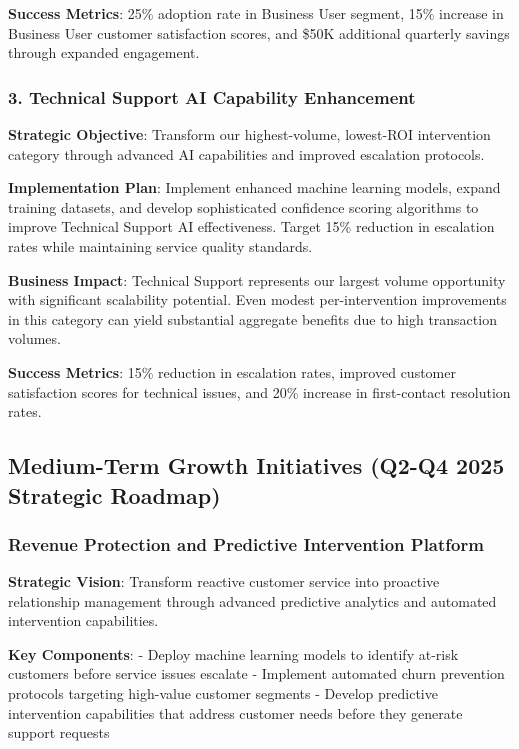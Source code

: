 \documentclass[
  letterpaper,
  DIV=11,
  numbers=noendperiod]{scrartcl}
\begin{document}
\textbf{Success Metrics}: 25\% adoption rate in Business User segment,
15\% increase in Business User customer satisfaction scores, and \$50K
additional quarterly savings through expanded engagement.

\subsubsection{3. Technical Support AI Capability
Enhancement}\label{technical-support-ai-capability-enhancement}

\textbf{Strategic Objective}: Transform our highest-volume, lowest-ROI
intervention category through advanced AI capabilities and improved
escalation protocols.

\textbf{Implementation Plan}: Implement enhanced machine learning
models, expand training datasets, and develop sophisticated confidence
scoring algorithms to improve Technical Support AI effectiveness. Target
15\% reduction in escalation rates while maintaining service quality
standards.

\textbf{Business Impact}: Technical Support represents our largest
volume opportunity with significant scalability potential. Even modest
per-intervention improvements in this category can yield substantial
aggregate benefits due to high transaction volumes.

\textbf{Success Metrics}: 15\% reduction in escalation rates, improved
customer satisfaction scores for technical issues, and 20\% increase in
first-contact resolution rates.

\subsection{Medium-Term Growth Initiatives (Q2-Q4 2025 Strategic
Roadmap)}\label{medium-term-growth-initiatives-q2-q4-2025-strategic-roadmap}

\subsubsection{Revenue Protection and Predictive Intervention
Platform}\label{revenue-protection-and-predictive-intervention-platform}

\textbf{Strategic Vision}: Transform reactive customer service into
proactive relationship management through advanced predictive analytics
and automated intervention capabilities.

\textbf{Key Components}: - Deploy machine learning models to identify
at-risk customers before service issues escalate - Implement automated
churn prevention protocols targeting high-value customer segments -
Develop predictive intervention capabilities that address customer needs
before they generate support requests
\end{document}
